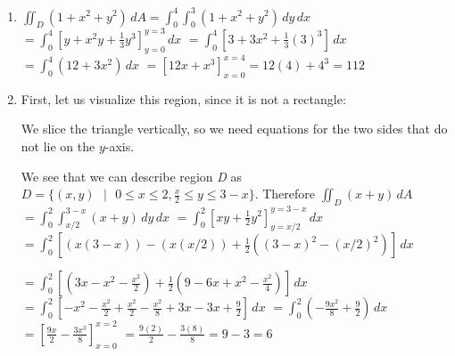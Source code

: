 \begin{Answer}[ref = total_mass]
\begin{enumerate}
    \item $\iint_{\textit{D}} \left(1 + x^2 + y^2 \right)\,dA = \int_0^4 
    \int_0^3 \left( 1  + x^2 + y^2 \right)\,dy\,dx$ $= \int_0^4 \left[y + x^2y 
    + \frac{1}{3}y^3 \right]_{y = 0}^{y = 3}\,dx$ $= \int_0^4 \left[ 3 + 3x^2 
    + \frac{1}{3}(3)^3 \right]\,dx$ $= \int_0^4 \left(12 + 3x^2 \right)\,dx$ 
    $= \left[ 12x + x^3 \right]_{x = 0}^{x = 4} = 12(4) + 4^3 = 112$
    \item First, let us visualize this region, since it is not a rectangle:
    

    We slice the triangle vertically, so we need equations for the two
    sides that do not lie on the $y$-axis.


    We see that we can describe region \textit{D} as $\textit{D} = \{ (x, y) 
    \text{ }|\text{ } 0 \leq x \leq 2, \frac{x}{2} \leq y \leq 3 - x\}$. 
    Therefore $\iint_{\textit{D}} \left( x + y \right) \,dA$ $= \int_0^2 \int_{
    x/2}^{3 - x} \left(x + y \right)\,dy\,dx$ $= \int_0^2 \left[xy + 
    \frac{1}{2} y^2 \right]_{y = x/2}^{y = 3 - x}\,dx$ $= \int_0^2 \left[ 
    \left(x(3 - x) \right) - \left(x (x/2) \right) + \frac{1}{2} \left( (3 - 
    x)^2 - (x/2)^2 \right) \right]\,dx$ 
    
    $= \int_0^2 \left[ \left(3x - x^2 - 
    \frac{x^2}{2} \right) + \frac{1}{2} \left( 9 - 6x + x^2 - \frac{x^2}{4} 
    \right) \right]\,dx$ $= \int_0^2 \left[-x^2 - \frac{x^2}{2} + \frac{x^2}{2}
    - \frac{x^2}{8} + 3x - 3x + \frac{9}{2} \right]\,dx$ $= \int_0^2 \left( -
    \frac{9x^2}{8} + \frac{9}{2} \right)\,dx$ $= \left[ \frac{9x}{2} -\frac{
    3x^3}{8} \right]_{x = 0}^{x = 2}$ $= \frac{9(2)}{2} - \frac{3(8)}{8} = 9 - 
    3 = 6$
\end{enumerate}
\end{Answer}

